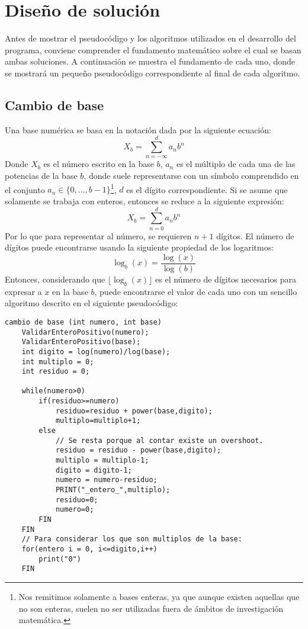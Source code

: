 \documentclass[conference]{IEEEtran}
\begin{document}
\section{Diseño de solución}
Antes de mostrar el pseudocódigo y los algoritmos utilizados en el desarrollo 
del programa, conviene comprender el fundamento matemático sobre el cual se basan
ambas soluciones. A continuación se muestra el fundamento de cada uno, donde se mostrará
un pequeño pseudocódigo correspondiente al final de cada algoritmo.
    \subsection{Cambio de base}
        Una base numérica se basa en la notación dada por la siguiente ecuación:
        \begin{equation*}
            X_b = \sum_{n=-\infty}^{d}a_nb^n
        \end{equation*}
        Donde $X_b$ es el número escrito en la base $b$, $a_n$ es el múltiplo
        de cada una de las potencias de la base $b$, donde suele representarse con un símbolo
        comprendido en el conjunto $a_n \in \{0,...,b-1\}$\footnote{Nos remitimos solamente a bases enteras, ya que aunque existen aquellas que no son enteras, suelen no ser utilizadas fuera de ámbitos de investigación matemática.},
        $d$ es el dígito correspondiente. Si se asume que solamente se trabaja con enteros, entonces se reduce a la siguiente expresión:
        \begin{equation}
            X_b = \sum_{n=0}^{d}a_nb^n
        \end{equation}
        Por lo que para representar al número, se requieren $n+1$ dígitos. El número de dígitos puede encontrarse usando
        la siguiente propiedad de los logaritmos:
        \begin{equation*}
            \log_b(x)=\frac{\log(x)}{\log(b)}
        \end{equation*}
        Entonces, considerando que $\lfloor\log_b(x)\rfloor$ es el número de dígitos
        necesarios para expresar a $x$ en la base $b$, puede encontrarse el valor de cada uno con un sencillo algoritmo descrito en el siguiente pseudocódigo:
        \begin{lstlisting}[style=mystyle]
cambio de base (int numero, int base)
    ValidarEnteroPositivo(numero);
    ValidarEnteroPositivo(base);
    int digito = log(numero)/log(base);
    int multiplo = 0;
    int residuo = 0;

    while(numero>0)
        if(residuo>=numero)
            residuo=residuo + power(base,digito);
            multiplo=multiplo+1;
        else
            // Se resta porque al contar existe un overshoot.
            residuo = residuo - power(base,digito);
            multiplo = multiplo-1;
            digito = digito-1;
            numero = numero-residuo;
            PRINT("_entero_",multiplo);
            residuo=0;
            numero=0; 
        FIN
    FIN
    // Para considerar los que son multiplos de la base:
    for(entero i = 0, i<=digito,i++)
        print("0")
    FIN
        \end{lstlisting}
\end{document}

